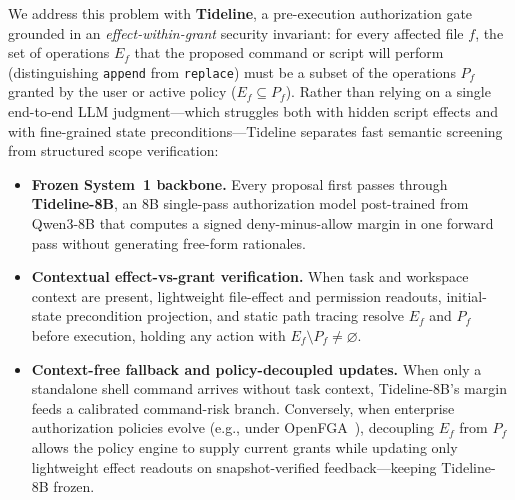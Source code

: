 \documentclass[sigconf,anonymous,nonacm]{acmart}
\begin{document}
We address this problem with \textbf{Tideline}, a pre-execution authorization gate grounded in an \emph{effect-within-grant} security invariant: for every affected file $f$, the set of operations $E_f$ that the proposed command or script will perform (distinguishing \texttt{append} from \texttt{replace}) must be a subset of the operations $P_f$ granted by the user or active policy ($E_f \subseteq P_f$). Rather than relying on a single end-to-end LLM judgment---which struggles both with hidden script effects and with fine-grained state preconditions---Tideline separates fast semantic screening from structured scope verification:
\begin{itemize}
    \item \textbf{Frozen System~1 backbone.} Every proposal first passes through \textbf{Tideline-8B}, an 8B single-pass authorization model post-trained from Qwen3-8B that computes a signed deny-minus-allow margin in one forward pass without generating free-form rationales.
    \item \textbf{Contextual effect-vs-grant verification.} When task and workspace context are present, lightweight file-effect and permission readouts, initial-state precondition projection, and static path tracing resolve $E_f$ and $P_f$ before execution, holding any action with $E_f \setminus P_f \neq \varnothing$.
    \item \textbf{Context-free fallback and policy-decoupled updates.} When only a standalone shell command arrives without task context, Tideline-8B's margin feeds a calibrated command-risk branch. Conversely, when enterprise authorization policies evolve (e.g., under OpenFGA~\cite{openfgastores}), decoupling $E_f$ from $P_f$ allows the policy engine to supply current grants while updating only lightweight effect readouts on snapshot-verified feedback---keeping Tideline-8B frozen.
\end{itemize}
\end{document}
